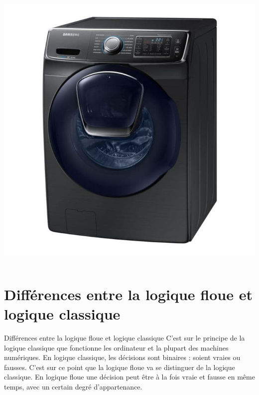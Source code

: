 \documentclass[aspectratio=169,professionalfonts, 12pt]{beamer}
\begin{document}
\begin{frame}
\begin{columns}[T]
		\begin{column}{.5\textwidth} 
			\includegraphics[height=0.9\textwidth]{images/machine.jpg}
    \end{column} 

  \end{columns}
\end{frame}

\section{Différences entre la logique floue et logique classique}

\begin{frame}{Différences entre la logique floue et logique classique}
  C’est sur le principe de la logique classique que fonctionne les ordinateur et
  la plupart des machines numériques. En logique classique, les décisions sont
  binaires : soient vraies ou fausses. C’est sur ce point que la logique floue 
  va se distinguer de la logique classique. En logique floue une décision peut
  être à la fois vraie et fausse en même temps, avec un certain degré
  d'appartenance.
\end{frame}
\end{document}
